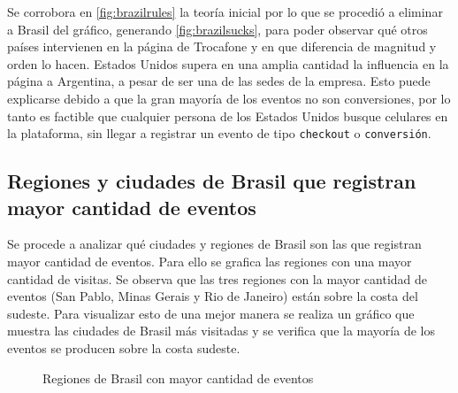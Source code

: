 \documentclass[a4paper]{article}
\begin{document}
Se corrobora en \ref{fig:brazilrules} la teoría inicial por lo que se procedió a eliminar a Brasil del gráfico, generando \ref{fig:brazilsucks}, para poder observar qué otros países intervienen en la página de Trocafone y en que diferencia de magnitud y orden lo hacen. Estados Unidos supera en una amplia cantidad la influencia en la página a Argentina, a pesar de ser una de las sedes de la empresa. Esto puede explicarse debido a que la gran mayoría de los eventos no son conversiones, por lo tanto es factible que cualquier persona de los Estados Unidos busque celulares en la plataforma, sin llegar a registrar un evento de tipo \texttt{checkout} o \texttt{conversión}.

\subsection{Regiones y ciudades de Brasil que registran mayor cantidad de eventos}

Se procede a analizar qué ciudades y regiones de Brasil son las que registran mayor cantidad de eventos. Para ello se grafica las regiones con una mayor cantidad de visitas. Se observa que las tres regiones con la mayor cantidad de eventos (San Pablo, Minas Gerais y Rio de Janeiro) están sobre la costa del sudeste. Para visualizar esto de una mejor manera se realiza un gráfico que muestra las ciudades de Brasil más visitadas y se verifica que la mayoría de los eventos se producen sobre la costa sudeste.

\begin{figure}[h!]
	\caption{Regiones de Brasil con mayor cantidad de eventos}
	\label{fig:regionsbrasil}
\end{figure}
\end{document}
